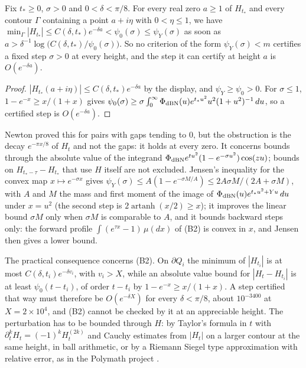 \begin{proposition}\label{nw:prop:height}
Fix $t_*\ge0$, $\sigma>0$ and $0<\delta<\pi/8$. For every real zero $a\ge1$ of $H_{t_*}$ and every contour $\Gamma$ containing a point $a+i\eta$ with $0<\eta\le1$, we have $\min_\Gamma|H_{t_*}|\le C(\delta,t_*)e^{-\delta a}<\psi_0(\sigma)\le\psi_Y(\sigma)$ as soon as $a>\delta^{-1}\log\bigl(C(\delta,t_*)/\psi_0(\sigma)\bigr)$. So no criterion of the form $\psi_Y(\sigma)<m$ certifies a fixed step $\sigma>0$ at every height, and the step it can certify at height $a$ is $O(e^{-\delta a})$.
\end{proposition}

\begin{proof}
$|H_{t_*}(a+i\eta)|\le C(\delta,t_*)e^{-\delta a}$ by the display, and $\psi_Y\ge\psi_0>0$. For $\sigma\le1$, $1-e^{-x}\ge x/(1+x)$ gives $\psi_0(\sigma)\ge\sigma\int_0^\infty\Phi_{\rm dBN}(u)e^{t_*u^2}u^2(1+u^2)^{-1}\,du$, so a certified step is $O(e^{-\delta a})$.
\end{proof}

Newton proved this for pairs with gaps tending to $0$, but the obstruction is the decay $e^{-\pi x/8}$ of $H_t$ and not the gaps: it holds at every zero. It concerns bounds through the absolute value of the integrand $\Phi_{\rm dBN}e^{tu^2}(1-e^{-\sigma u^2})\cos(zu)$; bounds on $H_{t_*-\tau}-H_{t_*}$ that use $H$ itself are not excluded. Jensen's inequality for the convex map $x\mapsto e^{-\sigma x}$ gives $\psi_Y(\sigma)\le A(1-e^{-\sigma M/A})\le2A\sigma M/(2A+\sigma M)$, with $A$ and $M$ the mass and first moment of the image of $\Phi_{\rm dBN}(u)e^{t_*u^2+Yu}\,du$ under $x=u^2$ (the second step is $2\operatorname{artanh}(x/2)\ge x$); it improves the linear bound $\sigma M$ only when $\sigma M$ is comparable to $A$, and it bounds backward steps only: the forward profile $\int(e^{\tau x}-1)\,\mu(dx)$ of (B2) is convex in $x$, and Jensen then gives a lower bound.

The practical consequence concerns (B2). On $\partial Q_i$ the minimum of $|H_{t_i}|$ is at most $C(\delta,t_i)e^{-\delta v_i}$, with $v_i>X$, while an absolute value bound for $|H_t-H_{t_i}|$ is at least $\psi_0(t-t_i)$, of order $t-t_i$ by $1-e^{-x}\ge x/(1+x)$. A step certified that way must therefore be $O(e^{-\delta X})$ for every $\delta<\pi/8$, about $10^{-3400}$ at $X=2\times10^4$, and (B2) cannot be checked by it at an appreciable height. The perturbation has to be bounded through $H$: by Taylor's formula in $t$ with $\partial_t^kH_t=(-1)^kH_t^{(2k)}$ and Cauchy estimates from $|H_t|$ on a larger contour at the same height, in ball arithmetic, or by a Riemann Siegel type approximation with relative error, as in the Polymath project \cite{Polymath}.
